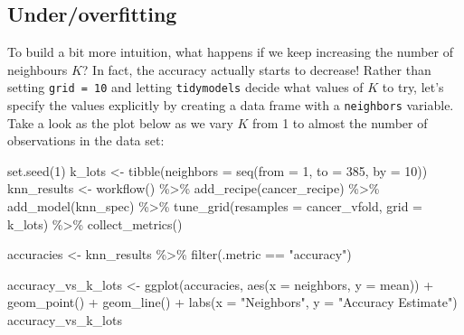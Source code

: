 \documentclass[
]{krantz}
\makeatletter
\newenvironment{Shaded}{\begin{snugshade}}{\end{snugshade}}
\newcommand{\AttributeTok}[1]{\textcolor[rgb]{0.61,0.61,0.61}{#1}}
\newcommand{\DecValTok}[1]{\textcolor[rgb]{0.06,0.06,0.06}{#1}}
\newcommand{\FunctionTok}[1]{\textcolor[rgb]{0,0,0}{#1}}
\newcommand{\NormalTok}[1]{#1}
\newcommand{\OtherTok}[1]{\textcolor[rgb]{0.37,0.37,0.37}{#1}}
\newcommand{\SpecialCharTok}[1]{\textcolor[rgb]{0,0,0}{#1}}
\newcommand{\StringTok}[1]{\textcolor[rgb]{0.5,0.5,0.5}{#1}}
\newenvironment{kframe}{%
\medskip{}
\setlength{\fboxsep}{.8em}
 \def\at@end@of@kframe{}%
 \ifinner\ifhmode%
  \def\at@end@of@kframe{\end{minipage}}%
  \begin{minipage}{\columnwidth}%
 \fi\fi%
 \def\FrameCommand##1{\hskip\@totalleftmargin \hskip-\fboxsep
 \colorbox{shadecolor}{##1}\hskip-\fboxsep
     \hskip-\linewidth \hskip-\@totalleftmargin \hskip\columnwidth}%
 \MakeFramed {\advance\hsize-\width
   \@totalleftmargin\z@ \linewidth\hsize
   \@setminipage}}%
 {\par\unskip\endMakeFramed%
 \at@end@of@kframe}
\renewenvironment{Shaded}{\begin{kframe}}{\end{kframe}}
\makeatother
\begin{document}
\hypertarget{underoverfitting}{%
\subsection{Under/overfitting}\label{underoverfitting}}

To build a bit more intuition, what happens if we keep increasing the number of neighbours \(K\)? In fact, the accuracy
actually starts to decrease! Rather than setting \texttt{grid\ =\ 10} and letting \texttt{tidymodels} decide what values of \(K\) to try,
let's specify the values explicitly by creating a data frame with a \texttt{neighbors} variable.
Take a look as the plot below as we vary \(K\) from 1 to almost the number of observations in the data set:

\begin{Shaded}
\begin{Highlighting}[]
\FunctionTok{set.seed}\NormalTok{(}\DecValTok{1}\NormalTok{)}
\NormalTok{k\_lots }\OtherTok{\textless{}{-}} \FunctionTok{tibble}\NormalTok{(}\AttributeTok{neighbors =} \FunctionTok{seq}\NormalTok{(}\AttributeTok{from =} \DecValTok{1}\NormalTok{, }\AttributeTok{to =} \DecValTok{385}\NormalTok{, }\AttributeTok{by =} \DecValTok{10}\NormalTok{))}
\NormalTok{knn\_results }\OtherTok{\textless{}{-}} \FunctionTok{workflow}\NormalTok{() }\SpecialCharTok{\%\textgreater{}\%}
  \FunctionTok{add\_recipe}\NormalTok{(cancer\_recipe) }\SpecialCharTok{\%\textgreater{}\%}
  \FunctionTok{add\_model}\NormalTok{(knn\_spec) }\SpecialCharTok{\%\textgreater{}\%}
  \FunctionTok{tune\_grid}\NormalTok{(}\AttributeTok{resamples =}\NormalTok{ cancer\_vfold, }\AttributeTok{grid =}\NormalTok{ k\_lots) }\SpecialCharTok{\%\textgreater{}\%}
  \FunctionTok{collect\_metrics}\NormalTok{()}

\NormalTok{accuracies }\OtherTok{\textless{}{-}}\NormalTok{ knn\_results }\SpecialCharTok{\%\textgreater{}\%}
  \FunctionTok{filter}\NormalTok{(.metric }\SpecialCharTok{==} \StringTok{"accuracy"}\NormalTok{)}

\NormalTok{accuracy\_vs\_k\_lots }\OtherTok{\textless{}{-}} \FunctionTok{ggplot}\NormalTok{(accuracies, }\FunctionTok{aes}\NormalTok{(}\AttributeTok{x =}\NormalTok{ neighbors, }\AttributeTok{y =}\NormalTok{ mean)) }\SpecialCharTok{+}
  \FunctionTok{geom\_point}\NormalTok{() }\SpecialCharTok{+}
  \FunctionTok{geom\_line}\NormalTok{() }\SpecialCharTok{+}
  \FunctionTok{labs}\NormalTok{(}\AttributeTok{x =} \StringTok{"Neighbors"}\NormalTok{, }\AttributeTok{y =} \StringTok{"Accuracy Estimate"}\NormalTok{)}
\NormalTok{accuracy\_vs\_k\_lots}
\end{Highlighting}
\end{Shaded}
\end{document}
